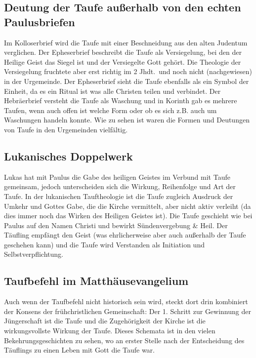 \subsection{Deutung der Taufe außerhalb von den echten Paulusbriefen}
Im Kolloserbrief wird die Taufe mit einer Beschneidung aus den alten Judentum verglichen. Der Epheserbrief beschreibt die Taufe als Versiegelung, bei den der Heilige Geist das Siegel ist und der Versiegelte Gott gehört. Die Theologie der Versiegelung fruchtete aber erst richtig im 2 Jhdt.\ und noch nicht (nachgewiesen) in der Urgemeinde. Der Epheserbrief sieht die Taufe ebenfalls als ein Symbol der Einheit, da es ein Ritual ist was alle Christen teilen und verbindet. Der Hebräerbrief versteht die Taufe als Waschung und in Korinth gab es mehrere Taufen, wenn auch offen ist welche Form oder ob es sich z.B. auch um Waschungen handeln konnte. Wie zu sehen ist waren die Formen und Deutungen von Taufe in den Urgemeinden vielfältig.

\subsection{Lukanisches Doppelwerk}
Lukas hat mit Paulus die Gabe des heiligen Geistes im Verbund mit Taufe gemeinsam, jedoch unterscheiden sich die Wirkung, Reihenfolge und Art der Taufe. In der lukanischen Tauftheologie ist die Taufe zugleich Ausdruck der Umkehr und Gottes Gabe, die die Kirche vermittelt, aber nicht aktiv verleiht (da dies immer noch das Wirken des Heiligen Geistes ist). Die Taufe geschieht wie bei Paulus auf den Namen Christi und bewirkt Sündenvergebung \& Heil. Der Täufling empfängt den Geist (was ehrlicherweise aber auch außerhalb der Taufe geschehen kann) und die Taufe wird Verstanden als Initiation und Selbstverpflichtung.

\subsection{Taufbefehl im Matthäusevangelium}
Auch wenn der Taufbefehl nicht historisch sein wird, steckt dort drin kombiniert der Konsens der frühchristlichen Gemeinschaft: Der 1. Schritt zur Gewinnung der Jüngerschaft ist die Taufe und die Zugehörigkeit der Kirche ist die wirkungsvollste Wirkung der Taufe. Dieses Schemata ist in den vielen Bekehrungsgeschichten zu sehen, wo an erster Stelle nach der Entscheidung des Täuflings zu einen Leben mit Gott die Taufe war.

